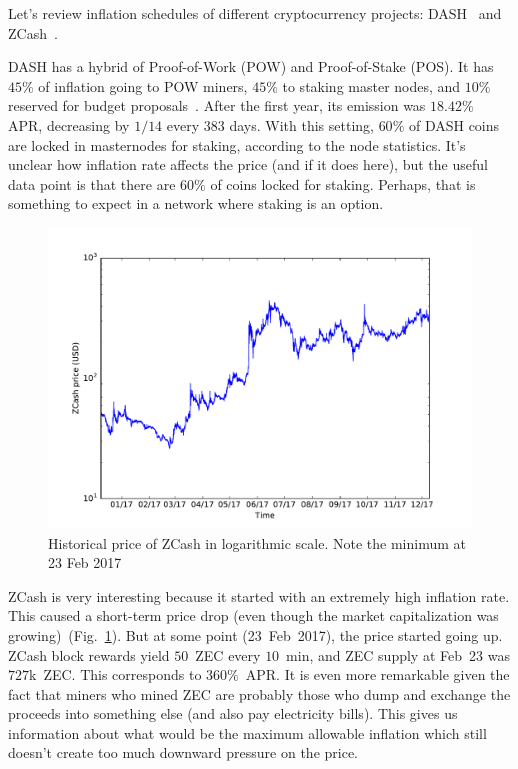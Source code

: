 \documentclass[longbibliography,nofootinbib,twocolumn]{revtex4-1}
\newcommand{\figref}[1]{Fig.~\ref{#1}}
\begin{document}
Let's review inflation schedules of different cryptocurrency projects:
DASH~\cite{dash:whitepaper} and ZCash~\cite{zcash}.

DASH has a hybrid of Proof-of-Work (POW) and Proof-of-Stake (POS).
It has $45\%$ of inflation going to POW miners, $45\%$ to staking master nodes, and $10\%$ reserved for budget proposals~\cite{dash:emission}.
After the first year, its emission was $18.42\%$ APR, decreasing by $1/14$ every $383$ days.
With this setting, $60\%$ of DASH coins are locked in masternodes for staking, according to the node statistics.
It's unclear how inflation rate affects the price (and if it does here), but the useful data point is that there are $60\%$ of coins locked for staking.
Perhaps, that is something to expect in a network where staking is an option.

\begin{figure}
    \includegraphics[width=\columnwidth]{pdf/zcash-price.pdf}
    \caption{Historical price of ZCash in logarithmic scale. Note the minimum at 23 Feb 2017}
    \label{fig:zec}
\end{figure}

ZCash is very interesting because it started with an extremely high inflation rate.
This caused a short-term price drop (even though the market capitalization was growing)~(\figref{fig:zec}).
But at some point (23~Feb~2017), the price started going up.
ZCash block rewards yield $50$~ZEC every $10$~min, and ZEC supply at Feb~23 was $727$k~ZEC.
This corresponds to $360\%$~APR.
It is even more remarkable given the fact that miners who mined ZEC are probably those who dump and exchange the proceeds into something else (and also pay
electricity bills).
This gives us information about what would be the maximum allowable inflation which still doesn't create too much downward pressure on the price.
\end{document}
